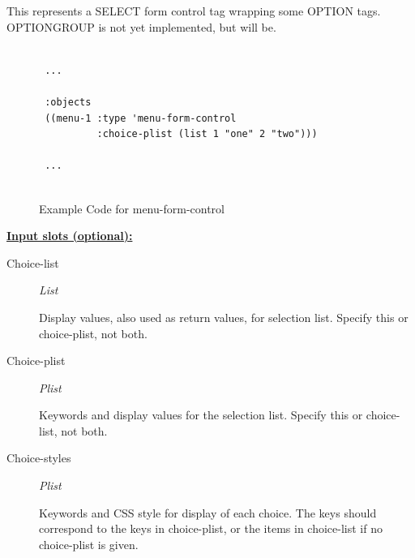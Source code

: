 \documentclass [11pt]{book}
\begin{document}
\begin{itemize}
\begin{description}
This represents a SELECT form control tag wrapping some OPTION tags.
OPTIONGROUP is not yet implemented, but will be.



\end{description}




\begin{figure}
\begin{lrbox}{\boxedverb}
\begin{minipage}{\linewidth}
{\small

\begin{verbatim}

 ...
 
 :objects
 ((menu-1 :type 'menu-form-control
          :choice-plist (list 1 "one" 2 "two")))

 ...


\end{verbatim}}
\end{minipage}
\end{lrbox}
\fbox{\usebox{\boxedverb}}

\caption{Example Code for menu-form-control}

\label{fig:example-code-menu-form-control}

\end{figure}





\textbf{
\underline{Input slots (optional):}}

\begin{description}

\item [Choice-list]
\emph{List}

 Display values, also used as return values, for selection list. Specify this or choice-plist, not both.




\item [Choice-plist]
\emph{Plist}

 Keywords and display values for the selection list. Specify this or choice-list, not both.




\item [Choice-styles]
\emph{Plist}

 Keywords and CSS style for display of each choice. The keys should correspond to the
keys in choice-plist, or the items in choice-list if no choice-plist is given.





\end{description}
\end{itemize}
\end{document}
